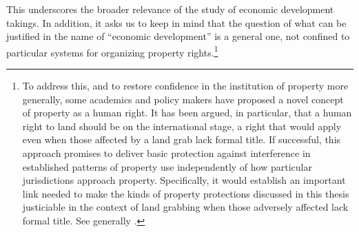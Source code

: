 This underscores the broader relevance of the study of economic development takings. In addition, it asks us to keep in mind that the question of what can be justified in the name of ``economic development'' is a general one, not confined to particular systems for organizing property rights.\footnote{To address this, and to restore confidence in the institution of property more generally, some academics and policy makers have proposed a novel concept of property as a human right. It has been argued, in particular, that a human right to land should be  on the international stage, a right that would apply even when those affected by a land grab lack formal title. If successful, this approach promises to deliver basic protection against interference in established patterns of property use independently of how particular jurisdictions approach property. Specifically, it would establish an important link needed to make the kinds of property protections discussed in this thesis justiciable in the context of land grabbing when those adversely affected lack formal title. See generally \cite{schutter10,schutter11,kunnerman13}.}

